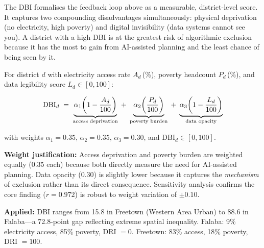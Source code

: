 \documentclass[preprint,12pt]{elsarticle}
\begin{document}
\bigskip

\begin{tcolorbox}[metDBI,
  title={Metric 2: Double Blindspot Index (DBI) ---
         How invisible is this district to AI systems?}]

The DBI formalises the feedback loop above as a measurable,
district-level score. It captures two compounding
disadvantages simultaneously: physical deprivation (no
electricity, high poverty) and digital invisibility (data
systems cannot see you). A district with a high DBI is at
the greatest risk of algorithmic exclusion because it has
the most to gain from AI-assisted planning and the least
chance of being seen by it.

For district $d$ with electricity access rate $A_d$\,(\%),
poverty headcount $P_d$\,(\%), and data legibility score
$L_d \in [0,100]$:

\begin{equation}
\mathrm{DBI}_d \;=\;
\underbrace{\alpha_1\!\left(1 - \dfrac{A_d}{100}\right)}_{%
  \text{access deprivation}}
\;+\;
\underbrace{\alpha_2\!\left(\dfrac{P_d}{100}\right)}_{%
  \text{poverty burden}}
\;+\;
\underbrace{\alpha_3\!\left(1 - \dfrac{L_d}{100}\right)}_{%
  \text{data opacity}}
\label{eq:dbi}
\end{equation}

\noindent with weights $\alpha_1 = 0.35$,
$\alpha_2 = 0.35$, $\alpha_3 = 0.30$, and
$\mathrm{DBI}_d \in [0,100]$.

\medskip
\textbf{Weight justification:} Access deprivation and poverty
burden are weighted equally (0.35 each) because both directly
measure the need for AI-assisted planning. Data opacity (0.30)
is slightly lower because it captures the \textit{mechanism}
of exclusion rather than its direct consequence. Sensitivity
analysis confirms the core finding ($r = 0.972$) is robust
to weight variation of $\pm0.10$.

\medskip
\textbf{Applied:} DBI ranges from 15.8 in Freetown
(Western Area Urban) to 88.6 in Falaba---a 72.8-point gap
reflecting extreme spatial inequality. Falaba: 9\%
electricity access, 85\% poverty, DRI $= 0$.
Freetown: 83\% access, 18\% poverty, DRI $= 100$.

\end{tcolorbox}

\bigskip
\end{document}
